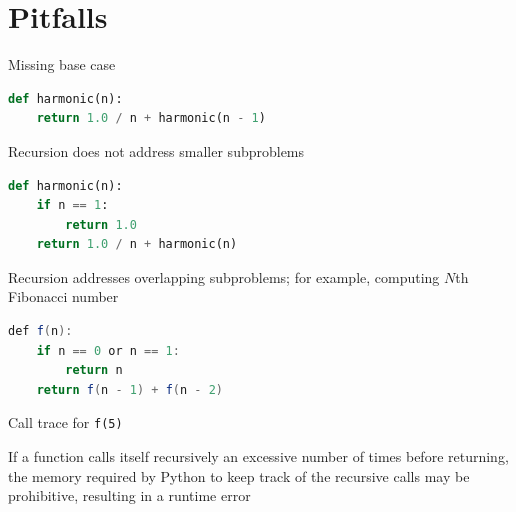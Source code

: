 \documentclass[8pt,a4paper,compress]{beamer}
\begin{document}
\section{Pitfalls}
\begin{frame}[fragile]
\pause

Missing base case
\begin{lstlisting}[language=Python]
def harmonic(n):
    return 1.0 / n + harmonic(n - 1)
\end{lstlisting}

\pause
\bigskip

Recursion does not address smaller subproblems
\begin{lstlisting}[language=Python]
def harmonic(n):
    if n == 1:
        return 1.0
    return 1.0 / n + harmonic(n)
\end{lstlisting}

\pause
\bigskip

\begin{minipage}{150pt}
Recursion addresses overlapping subproblems; for example, computing $N$th Fibonacci number

\begin{lstlisting}[language=Java]
def f(n):
    if n == 0 or n == 1:
        return n
    return f(n - 1) + f(n - 2)  
\end{lstlisting}
\end{minipage}
\begin{minipage}{150pt}
\begin{center}
Call trace for \lstinline{f(5)}

\smallskip

\end{center}
\end{minipage}

\pause
\bigskip

If a function calls itself recursively an excessive number of times before returning, the memory required by Python to keep track of the recursive calls may be prohibitive, resulting in a runtime error
\end{frame}
\end{document}
